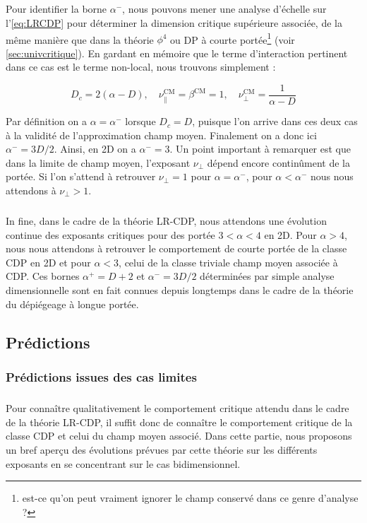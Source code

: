 \subparagraph{}Pour identifier la borne $\alpha^-$, nous pouvons mener une analyse d'échelle sur l'\autoref{eq:LRCDP} pour déterminer la dimension critique supérieure associée, de la même manière que dans la théorie $\phi^4$ ou DP à courte portée\footnote{est-ce qu'on peut vraiment ignorer le champ conservé dans ce genre d'analyse ?} (voir \autoref{sec:univcritique}). En gardant en mémoire que le terme d'interaction pertinent dans ce cas est le terme non-local, nous trouvons simplement :

\begin{equation}
	D_c = 2(\alpha-D),\quad \nu_\parallel^\text{CM}= \beta^\text{CM}= 1, \quad \nu_\perp^\text{CM}=\frac{1}{\alpha-D}
\end{equation}

\noindent Par définition on a $\alpha = \alpha^-$ lorsque $D_c=D$, puisque l'on arrive dans ces deux cas à la validité de l'approximation champ moyen. Finalement on a donc ici $\alpha^- = 3D/2$. Ainsi, en 2D on a $\alpha^-=3$. Un point important à remarquer est que dans la limite de champ moyen, l'exposant $\nu_\perp$ dépend encore continûment de la portée. Si l'on s'attend à retrouver $\nu_\perp = 1$ pour $\alpha=\alpha^-$, pour $\alpha < \alpha^-$ nous nous attendons à $\nu_\perp > 1$.

\subparagraph{}In fine, dans le cadre de la théorie LR-CDP, nous attendons une évolution continue des exposants critiques pour des portée $3<\alpha<4$ en 2D. Pour $\alpha>4$, nous nous attendons à retrouver le comportement de courte portée de la classe CDP en 2D et pour $\alpha<3$, celui de la classe triviale champ moyen associée à CDP. Ces bornes $\alpha^+ = D+2$ et $\alpha^-=3D/2$ déterminées par simple analyse dimensionnelle sont en fait connues depuis longtemps dans le cadre de la théorie du dépiégeage à longue portée.

\subsection{Prédictions}

\subsubsection{Prédictions issues des cas limites}

\subparagraph{}Pour connaître qualitativement le comportement critique attendu dans le cadre de la théorie LR-CDP, il suffit donc de connaître le comportement critique de la classe CDP et celui du champ moyen associé. Dans cette partie, nous proposons un bref aperçu des évolutions prévues par cette théorie sur les différents exposants en se concentrant sur le cas bidimensionnel.

